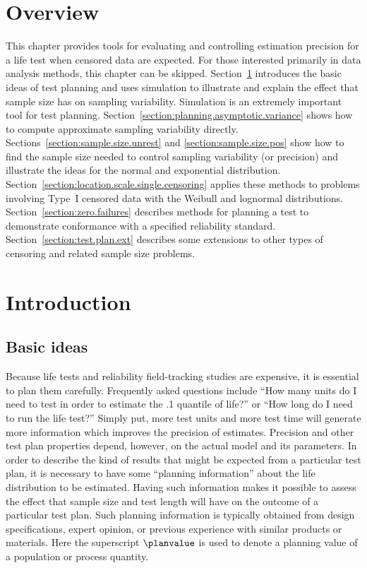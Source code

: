 \section*{Overview}
This chapter provides tools for evaluating and controlling 
estimation precision for a life
test when censored data are expected.  For
those interested primarily in data analysis methods, this chapter can be
skipped.  Section~\ref{section:planning.intro} introduces the basic
ideas of test planning and uses simulation to illustrate and explain
the effect that sample size has on sampling variability. Simulation
is an extremely important tool for test planning.
Section~\ref{section:planning.asymptotic.variance} shows how to
compute approximate sampling variability directly.
Sections~\ref{section:sample.size.unrest} and 
\ref{section:sample.size.pos} show how to find the sample size
needed to control sampling variability (or precision) and illustrate
the ideas for the normal and exponential distribution.
Section~\ref{section:location.scale.single.censoring} applies these
methods to problems involving Type~I censored data with the Weibull
and lognormal distributions.  Section~\ref{section:zero.failures}
describes methods for planning a test to demonstrate conformance
with a specified reliability standard.
Section~\ref{section:test.plan.ext} describes some extensions to
other types of censoring and related sample size problems.
\section{Introduction}
\label{section:planning.intro}
\subsection{Basic ideas}
Because life tests and reliability field-tracking studies are
expensive, it is essential to plan them carefully. Frequently asked
questions include ``How many units do I need to test in order to
estimate the .1 quantile of life?'' or ``How long do I need to run the
life test?'' Simply put, more test units and more test time will generate
more information which improves the precision of estimates.  
Precision and other test plan properties depend, however, on the
actual model and its parameters. In
order to describe the kind of results that might be expected from a
particular test plan, it is necessary to have some ``planning
information'' about the life distribution to be estimated.  Having
such information makes it possible to assess the effect that sample
size and test length will have on the outcome of a particular test
plan. Such planning information is typically obtained from design
specifications, expert opinion, or previous experience with similar
products or materials.
Here  the superscript $\planvalue$ is used to denote a planning
value of a population or process quantity.

